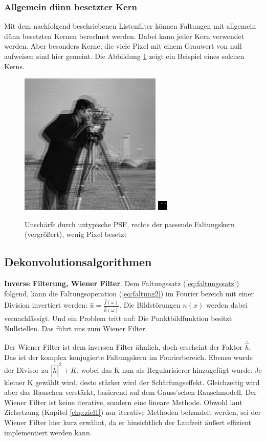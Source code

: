 \documentclass[a4paper,12pt]{article}
\begin{document}
\subsubsection{Allgemein dünn besetzter Kern}
Mit dem nachfolgend beschriebenen Listenfilter können Faltungen mit allgemein
dünn besetzten Kernen berechnet werden. Dabei kann jeder Kern verwendet werden.
Aber besonders Kerne, die viele Pixel mit einem Grauwert von null aufweisen
sind hier gemeint. Die Abbildung \ref{figure_duenn} zeigt ein Beispiel eines
solchen Kerns.

\begin{figure}[htbp]
\centering
\includegraphics[scale=0.8]{out_krumm17.png}
\includegraphics[scale=5]{krumm17.png}
\caption{Unschärfe durch untypische PSF, rechts der passende Faltungskern
(vergrößert), wenig Pixel besetzt}%
\label{figure_duenn}
\end{figure}


 
\newpage
\subsection{Dekonvolutionsalgorithmen}\label{chp:algoritmen}

\textbf{Inverse Filterung, Wiener Filter}. 
Dem Faltungssatz (\ref{eq:faltungssatz}) folgend, kann die Faltungsoperation
(\ref{eq:faltung2}) im Fourier bereich mit einer Division invertiert werden:
$\hat u = \frac{\hat{f}(\omega)} {\hat{h}(\omega)}$. Die Bildstörungen $n(x)$
werden dabei vernachlässigt. Und ein Problem tritt auf:
Die Punktbildfunktion besitzt Nullstellen. Das führt uns zum Wiener Filter.

Der Wiener Filter\cite{wiener} ist dem inversen Filter ähnlich, doch erscheint
der Faktor $\bar{\hat{h}}$. Das ist der komplex konjugierte Faltungskern im
Fourierbereich. Ebenso wurde der Divisor zu $|\hat{h}|^{2}+K$, wobei das K nun
als Regularisierer hinzugefügt wurde. Je kleiner K gewählt wird, desto stärker
wird der Schärfungseffekt. Gleichzeitig wird aber das Rauschen verstärkt,
basierend auf dem Gauss'schen Rauschmodell.
Der Wiener Filter ist keine iterative, sondern eine lineare Methode. 
Obwohl laut Zielsetzung (Kapitel \ref{chp:ziel1}) nur iterative Methoden behandelt
werden, sei der Wiener Filter hier kurz erwähnt, 
da er hinsichtlich der Laufzeit äußert
effizient implementiert werden kann. 
\end{document}
